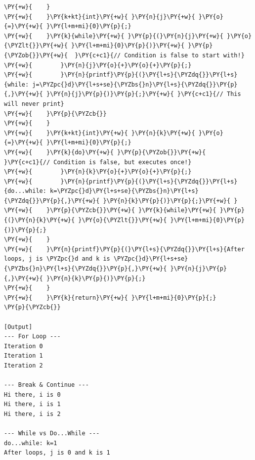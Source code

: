\begin{Verbatim}[label=\makebox{\url{https://github.com/lucabaldini/cmepda/tree/master/slides/latex/snippets/loops.c}},commandchars=\\\{\}]
\PY{+w}{    }
\PY{+w}{    }\PY{k+kt}{int}\PY{+w}{ }\PY{n}{j}\PY{+w}{ }\PY{o}{=}\PY{+w}{ }\PY{l+m+mi}{0}\PY{p}{;}
\PY{+w}{    }\PY{k}{while}\PY{+w}{ }\PY{p}{(}\PY{n}{j}\PY{+w}{ }\PY{o}{\PYZlt{}}\PY{+w}{ }\PY{l+m+mi}{0}\PY{p}{)}\PY{+w}{ }\PY{p}{\PYZob{}}\PY{+w}{  }\PY{c+c1}{// Condition is false to start with!}
\PY{+w}{        }\PY{n}{j}\PY{o}{+}\PY{o}{+}\PY{p}{;}
\PY{+w}{        }\PY{n}{printf}\PY{p}{(}\PY{l+s}{\PYZdq{}}\PY{l+s}{while: j=\PYZpc{}d}\PY{l+s+se}{\PYZbs{}n}\PY{l+s}{\PYZdq{}}\PY{p}{,}\PY{+w}{ }\PY{n}{j}\PY{p}{)}\PY{p}{;}\PY{+w}{ }\PY{c+c1}{// This will never print}
\PY{+w}{    }\PY{p}{\PYZcb{}}
\PY{+w}{    }
\PY{+w}{    }\PY{k+kt}{int}\PY{+w}{ }\PY{n}{k}\PY{+w}{ }\PY{o}{=}\PY{+w}{ }\PY{l+m+mi}{0}\PY{p}{;}
\PY{+w}{    }\PY{k}{do}\PY{+w}{ }\PY{p}{\PYZob{}}\PY{+w}{             }\PY{c+c1}{// Condition is false, but executes once!}
\PY{+w}{        }\PY{n}{k}\PY{o}{+}\PY{o}{+}\PY{p}{;}
\PY{+w}{        }\PY{n}{printf}\PY{p}{(}\PY{l+s}{\PYZdq{}}\PY{l+s}{do...while: k=\PYZpc{}d}\PY{l+s+se}{\PYZbs{}n}\PY{l+s}{\PYZdq{}}\PY{p}{,}\PY{+w}{ }\PY{n}{k}\PY{p}{)}\PY{p}{;}\PY{+w}{ }
\PY{+w}{    }\PY{p}{\PYZcb{}}\PY{+w}{ }\PY{k}{while}\PY{+w}{ }\PY{p}{(}\PY{n}{k}\PY{+w}{ }\PY{o}{\PYZlt{}}\PY{+w}{ }\PY{l+m+mi}{0}\PY{p}{)}\PY{p}{;}
\PY{+w}{    }
\PY{+w}{    }\PY{n}{printf}\PY{p}{(}\PY{l+s}{\PYZdq{}}\PY{l+s}{After loops, j is \PYZpc{}d and k is \PYZpc{}d}\PY{l+s+se}{\PYZbs{}n}\PY{l+s}{\PYZdq{}}\PY{p}{,}\PY{+w}{ }\PY{n}{j}\PY{p}{,}\PY{+w}{ }\PY{n}{k}\PY{p}{)}\PY{p}{;}
\PY{+w}{    }
\PY{+w}{    }\PY{k}{return}\PY{+w}{ }\PY{l+m+mi}{0}\PY{p}{;}
\PY{p}{\PYZcb{}}

[Output]
--- For Loop ---
Iteration 0
Iteration 1
Iteration 2

--- Break & Continue ---
Hi there, i is 0
Hi there, i is 1
Hi there, i is 2

--- While vs Do...While ---
do...while: k=1
After loops, j is 0 and k is 1
\end{Verbatim}